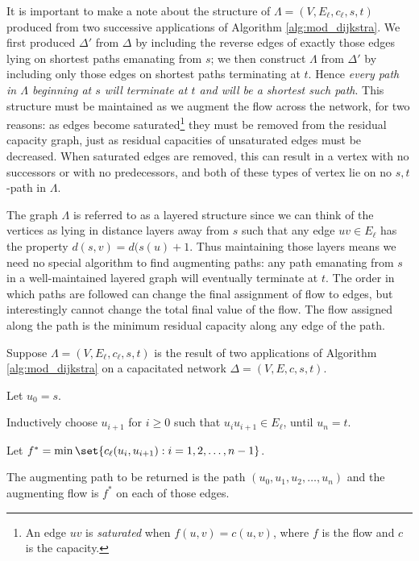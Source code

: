 \documentclass[m3380-lec-main.tex]{subfiles}
\begin{document}
It is important to make a note about the structure of $\Lambda = (V,E_\ell,c_\ell,s,t)$ produced from two successive applications of Algorithm \ref{alg:mod_dijkstra}. We first produced $\Delta'$ from $\Delta$ by including the reverse edges of exactly those edges lying on shortest paths emanating from $s$; we then construct $\Lambda$ from $\Delta'$ by including only those edges on shortest paths terminating at $t$. Hence \emph{every path in $\Lambda$ beginning at $s$ will terminate at $t$ and will be a shortest such path}. This structure must be maintained as we augment the flow across the network, for two reasons: as edges become saturated\footnote{An edge $uv$ is \emph{saturated} when $f(u,v)=c(u,v)$, where $f$ is the flow and $c$ is the capacity.} they must be removed from the residual capacity graph, just as residual capacities of unsaturated edges must be decreased. When saturated edges are removed, this can result in a vertex with no successors or with no predecessors, and both of these types of vertex lie on no $s,t$-path in $\Lambda$.

The graph $\Lambda$ is referred to as a layered structure since we can think of the vertices as lying in distance layers away from $s$ such that any edge $uv\in E_\ell$ has the property $d(s,v)=d(s(u)+1$. Thus maintaining those layers means we need no special algorithm to find augmenting paths: any path emanating from $s$ in a well-maintained layered graph will eventually terminate at $t$. The order in which paths are followed can change the final assignment of flow to edges, but interestingly cannot change the total final value of the flow. The flow assigned along the path is the minimum residual capacity along any edge of the path.

\begin{alg}[Pathfinding]\label{alg:pathfind} Suppose $\Lambda = (V,E_\ell,c_\ell,s,t)$ is the result of two applications of Algorithm \ref{alg:mod_dijkstra} on a capacitated network $\Delta=(V,E,c,s,t)$.
\begin{enum}
\item Let $u_0=s$.
\item Inductively choose $u_{i+1}$ for $i\geq 0$ such that $u_iu_{i+1}\in E_\ell$, until $u_n=t$.
\item Let $f^* = \min\set{c_\ell(u_i,u_{i+1}):i=1,2,\ldots,n-1}$.
\item The augmenting path to be returned is the path $(u_0,u_1,u_2,\ldots,u_n)$ and the augmenting flow is $f^*$ on each of those edges.
\end{enum}
\end{alg}
\end{document}
